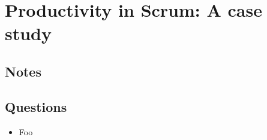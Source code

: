 \chapter{Productivity in Scrum: A case study \cite{dongen2011productivity}}
\section{Notes}

\section{Questions}
\begin{itemize}
  \item Foo
\end{itemize}
